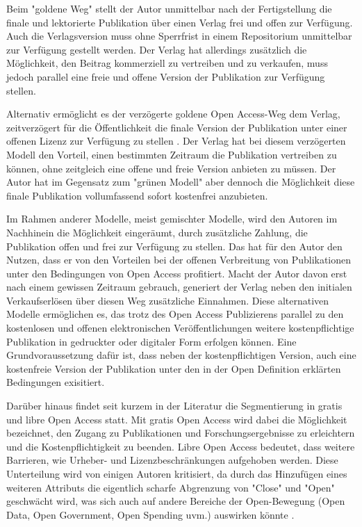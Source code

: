 Beim "goldene Weg" stellt der Autor unmittelbar nach der Fertigstellung die finale und lektorierte Publikation über einen Verlag frei und offen zur Verfügung. Auch die Verlagsversion muss ohne Sperrfrist in einem Repositorium unmittelbar zur Verfügung gestellt werden. Der Verlag hat allerdings zusätzlich die Möglichkeit, den Beitrag kommerziell zu vertreiben und zu verkaufen, muss jedoch parallel eine freie und offene Version der Publikation zur Verfügung stellen.

Alternativ ermöglicht es der verzögerte goldene Open Access-Weg dem Verlag, zeitverzögert für die Öffentlichkeit die finale Version der Publikation unter einer offenen Lizenz zur Verfügung zu stellen \cite{lewis_2012_inevitability}. Der Verlag hat bei diesem verzögerten Modell den Vorteil, einen bestimmten Zeitraum die Publikation vertreiben zu können, ohne zeitgleich eine offene und freie Version anbieten zu müssen. Der Autor hat im Gegensatz zum "grünen Modell" aber dennoch die Möglichkeit diese finale Publikation vollumfassend sofort kostenfrei anzubieten.

Im Rahmen anderer Modelle, meist gemischter Modelle, wird den Autoren im Nachhinein die Möglichkeit eingeräumt, durch zusätzliche Zahlung, die Publikation offen und frei zur Verfügung zu stellen\cite{lewis_2012_inevitability}. Das hat für den Autor den Nutzen, dass er von den Vorteilen bei der offenen Verbreitung von Publikationen unter den Bedingungen von Open Access profitiert. Macht der Autor davon erst nach einem gewissen Zeitraum gebrauch, generiert der Verlag neben den initialen Verkaufserlösen über diesen Weg zusätzliche Einnahmen. Diese alternativen Modelle ermöglichen es, das trotz des Open Access Publizierens parallel zu den kostenlosen und offenen elektronischen Veröffentlichungen weitere kostenpflichtige Publikation in gedruckter oder digitaler Form erfolgen können. Eine Grundvoraussetzung dafür ist, dass neben der kostenpflichtigen Version, auch eine kostenfreie Version der Publikation unter den in der Open Definition erklärten Bedingungen exisitiert.

Darüber hinaus findet seit kurzem in der Literatur die Segmentierung in gratis und libre Open Access statt. Mit gratis Open Access wird dabei die Möglichkeit bezeichnet, den Zugang zu Publikationen und Forschungsergebnisse zu erleichtern und die Kostenpflichtigkeit zu beenden. Libre Open Access bedeutet, dass weitere Barrieren, wie Urheber- und Lizenzbeschränkungen aufgehoben werden. \cite{Adema_2014_open_access} Diese Unterteilung wird von einigen Autoren kritisiert, da durch das Hinzufügen eines weiteren Attributs die eigentlich scharfe Abgrenzung von "Close" und "Open" geschwächt wird, was sich auch auf andere Bereiche der Open-Bewegung (Open Data, Open Government, Open Spending uvm.) auswirken könnte \cite{suchen}.

